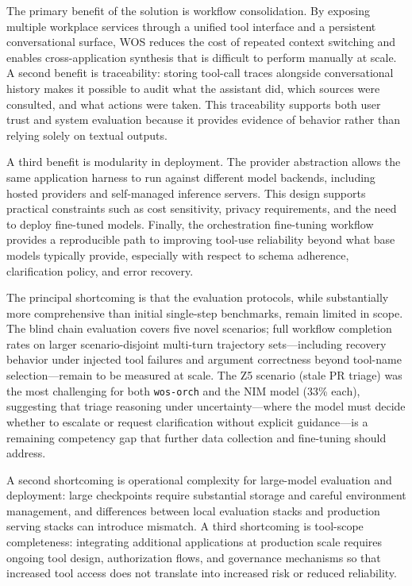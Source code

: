 \documentclass[conference]{IEEEtran}
\begin{document}
The primary benefit of the solution is workflow consolidation. By exposing multiple workplace services through a unified tool interface and a persistent conversational surface, WOS reduces the cost of repeated context switching and enables cross-application synthesis that is difficult to perform manually at scale. A second benefit is traceability: storing tool-call traces alongside conversational history makes it possible to audit what the assistant did, which sources were consulted, and what actions were taken. This traceability supports both user trust and system evaluation because it provides evidence of behavior rather than relying solely on textual outputs.

A third benefit is modularity in deployment. The provider abstraction allows the same application harness to run against different model backends, including hosted providers and self-managed inference servers. This design supports practical constraints such as cost sensitivity, privacy requirements, and the need to deploy fine-tuned models. Finally, the orchestration fine-tuning workflow provides a reproducible path to improving tool-use reliability beyond what base models typically provide, especially with respect to schema adherence, clarification policy, and error recovery.

The principal shortcoming is that the evaluation protocols, while substantially more comprehensive than initial single-step benchmarks, remain limited in scope. The blind chain evaluation covers five novel scenarios; full workflow completion rates on larger scenario-disjoint multi-turn trajectory sets---including recovery behavior under injected tool failures and argument correctness beyond tool-name selection---remain to be measured at scale. The Z5 scenario (stale PR triage) was the most challenging for both \texttt{wos-orch} and the NIM model (33\% each), suggesting that triage reasoning under uncertainty---where the model must decide whether to escalate or request clarification without explicit guidance---is a remaining competency gap that further data collection and fine-tuning should address.

A second shortcoming is operational complexity for large-model evaluation and deployment: large checkpoints require substantial storage and careful environment management, and differences between local evaluation stacks and production serving stacks can introduce mismatch. A third shortcoming is tool-scope completeness: integrating additional applications at production scale requires ongoing tool design, authorization flows, and governance mechanisms so that increased tool access does not translate into increased risk or reduced reliability.
\end{document}
